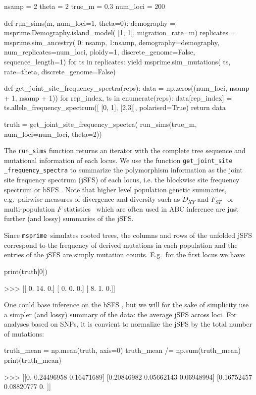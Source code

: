 \documentclass[graybox]{svmult}
\newcommand{\msprime}[0]{\texttt{msprime}}
\begin{document}
\begin{pythoncode}
nsamp = 2
theta = 2
true_m = 0.3
num_loci = 200

def run_sims(m, num_loci=1, theta=0):
    demography = msprime.Demography.island_model(
        [1, 1], migration_rate=m)
    replicates = msprime.sim_ancestry(
        {0: nsamp, 1:nsamp}, demography=demography,
        num_replicates=num_loci, ploidy=1,
        discrete_genome=False, sequence_length=1)
    for ts in replicates:
        yield msprime.sim_mutations(
            ts, rate=theta, discrete_genome=False)

def get_joint_site_frequency_spectra(reps):
    data = np.zeros((num_loci, nsamp + 1, nsamp + 1))
    for rep_index, ts in enumerate(reps):
        data[rep_index] = ts.allele_frequency_spectrum([
            [0, 1], [2,3]], polarised=True)
    return data

truth = get_joint_site_frequency_spectra(
    run_sims(true_m, num_loci=num_loci, theta=2))
\end{pythoncode}

    The \texttt{run\_sims} function returns an iterator with the complete
tree sequence and mutational information of each locus. We use the
function \texttt{get\_joint\_site} \texttt{\_frequency\_spectra} to summarize the
polymorphism information as the joint site frequency spectrum (jSFS) of
each locus, i.e. the blockwise site frequency spectrum
or bSFS \cite[sensu][]{Lohse2016}.
Note that higher level population genetic summaries, e.g.\ pairwise
measures of divergence and diversity such as \(D_{XY}\) \citep{Nei1972} and
\(F_{ST}\)~\citep{wright1950genetical} or multi-population \(F\)
statistics~\citep{Durand2009,patterson2012ancient} which are often
used in ABC inference are just further (and lossy) summaries of the jSFS.

Since \msprime\ simulates rooted trees, the columns and rows
of the unfolded jSFS correspond to the frequency of derived mutations in
each population and the entries of the jSFS are simply mutation counts.
E.g.\ for the first locus we have:
\begin{pythoncode}
print(truth[0])

>>> [[ 0.  14.  0.]
     [ 0.  0.  0.]
     [ 8.  1.  0.]]
\end{pythoncode}

    One could base inference on the bSFS \citep{Lohse2016, Beeravolu2017}, but we will for the sake of simplicity use a simpler (and lossy)
summary of the data: the average jSFS across loci. For analyses based on
SNPs, it is convient to normalize the jSFS by the total number of
mutations:
\begin{pythoncode}
truth_mean = np.mean(truth, axis=0)
truth_mean /= np.sum(truth_mean)
print(truth_mean)

>>> [[0.         0.24496958 0.16471689]
     [0.20846982 0.05662143 0.06948994]
     [0.16752457 0.08820777 0.        ]]
\end{pythoncode}
\end{document}
